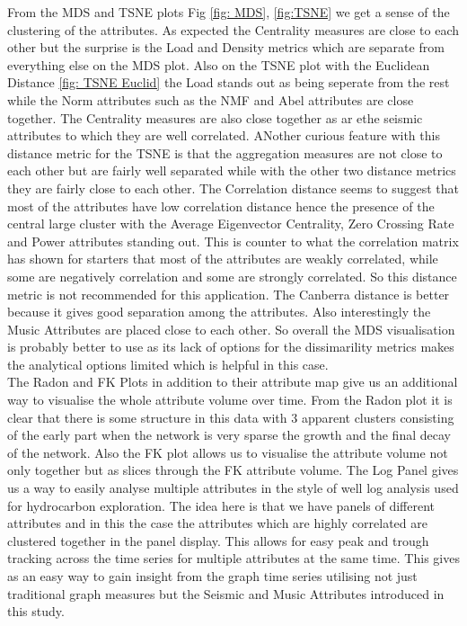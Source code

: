 From the MDS and TSNE plots Fig \ref{fig: MDS}, \ref{fig:TSNE} we get a sense of the clustering of the attributes. As expected the Centrality measures are close to each other but the surprise is the Load and Density metrics which are separate from everything else on the MDS plot. Also on the TSNE plot with the Euclidean Distance \ref{fig: TSNE Euclid} the Load stands out as being seperate from the rest while the Norm attributes such as the NMF and Abel attributes are close together. The Centrality measures are also close together as ar ethe seismic attributes to which they are well correlated. ANother curious feature with this distance metric for the TSNE is that the aggregation measures are not close to each other but are fairly well separated while with the other two distance metrics they are fairly close to each other.
The Correlation distance seems to suggest that most of the attributes have low correlation distance hence the presence of the central large cluster with the Average Eigenvector Centrality, Zero Crossing Rate and Power attributes standing out. This is counter to what the correlation matrix has shown for starters that most of the attributes are weakly correlated, while some are negatively correlation and some are strongly correlated. So this distance metric is not recommended for this application. The Canberra distance is better because it gives good separation among the attributes. Also interestingly the Music Attributes are placed close to each other. So overall the MDS visualisation is probably better to use as its lack of options for the dissimarility metrics makes the analytical options limited which is helpful in this case. \\

The Radon and FK Plots in addition to their attribute map give us an additional way to visualise the whole attribute volume over time. From the Radon plot it is clear that there is some structure in this data with 3 apparent clusters consisting of the early part when the network is very sparse the growth and the final decay of the network. Also the FK plot allows us to visualise the attribute volume not only together but as slices through the FK attribute volume. The Log Panel gives us a way to easily analyse multiple attributes in the style of well log analysis used for hydrocarbon exploration. The idea here is that we have panels of different attributes and in this the case the attributes which are highly correlated are clustered together in the panel display. This allows for easy peak and trough tracking across the time series for multiple attributes at the same time. This gives as an easy way to gain insight from the graph time series utilising not just traditional graph measures but the Seismic and Music Attributes introduced in this study.\\

